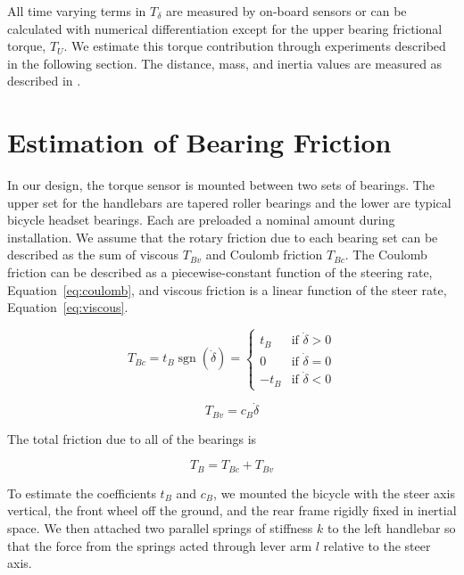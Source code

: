 \documentclass[10pt]{article}
\begin{document}
All time varying terms in $T_\delta$ are measured by on-board sensors or can be
calculated with numerical differentiation except for the upper bearing
frictional torque, $T_U$. We estimate this torque contribution through
experiments described in the following section. The distance, mass, and inertia
values are measured as described in \cite{Moore2012}.

\section*{Estimation of Bearing Friction}
\label{sec:bearing-friction}

In our design, the torque sensor is mounted between two sets of bearings. The
upper set for the handlebars are tapered roller bearings and the lower are
typical bicycle headset bearings. Each are preloaded a nominal amount during
installation. We assume that the rotary friction due to each bearing set can be
described as the sum of viscous $T_{Bv}$ and Coulomb friction $T_{Bc}$. The
Coulomb friction can be described as a piecewise-constant function of the
steering rate, Equation~\ref{eq:coulomb}, and viscous friction is a linear
function of the steer rate, Equation~\ref{eq:viscous}.

\begin{equation}
  T_{Bc} = t_B \operatorname{sgn}(\dot\delta) =
  \begin{cases}
    t_B  & \textrm{if $\dot{\delta}>0$}\\
    0    & \textrm{if $\dot{\delta}=0$}\\
    -t_B & \textrm{if $\dot{\delta}<0$}
  \end{cases}
  \label{eq:coulomb}
\end{equation}

\begin{equation}
  \label{eq:viscous}
  T_{Bv} = c_B \dot{\delta}
\end{equation}

The total friction due to all of the bearings is

\begin{equation}
  T_B = T_{Bc} + T_{Bv}
\end{equation}

To estimate the coefficients $t_B$ and $c_B$, we mounted the bicycle with the
steer axis vertical, the front wheel off the ground, and the rear frame rigidly
fixed in inertial space. We then attached two parallel springs of stiffness $k$
to the left handlebar so that the force from the springs acted through lever
arm $l$ relative to the steer axis.
\end{document}
